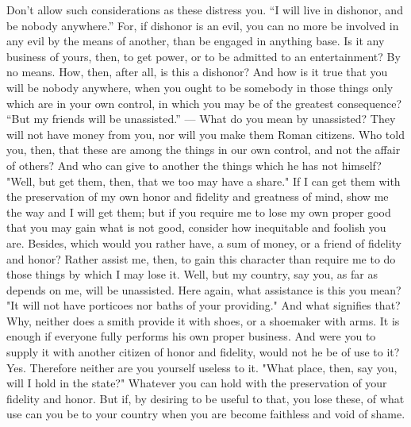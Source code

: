 Don't allow such considerations as these distress you. ``I will
live in dishonor, and be nobody anywhere.'' For, if dishonor is an
evil, you can no more be involved in any evil by the means of another,
than be engaged in anything base. Is it any business of yours, then,
to get power, or to be admitted to an entertainment? By no means.
How, then, after all, is this a dishonor? And how is it true that
you will be nobody anywhere, when you ought to be somebody in those
things only which are in your own control, in which you may be of
the greatest consequence? ``But my friends will be unassisted.'' ---
What do you mean by unassisted? They will not have money from you,
nor will you make them Roman citizens. Who told you, then, that these
are among the things in our own control, and not the affair of others?
And who can give to another the things which he has not himself? "Well,
but get them, then, that we too may have a share." If I can get them
with the preservation of my own honor and fidelity and greatness of
mind, show me the way and I will get them; but if you require me to
lose my own proper good that you may gain what is not good, consider
how inequitable and foolish you are. Besides, which would you rather
have, a sum of money, or a friend of fidelity and honor? Rather assist
me, then, to gain this character than require me to do those things
by which I may lose it. Well, but my country, say you, as far as depends
on me, will be unassisted. Here again, what assistance is this you
mean? "It will not have porticoes nor baths of your providing." And
what signifies that? Why, neither does a smith provide it with shoes,
or a shoemaker with arms. It is enough if everyone fully performs
his own proper business. And were you to supply it with another citizen
of honor and fidelity, would not he be of use to it? Yes. Therefore
neither are you yourself useless to it. "What place, then, say you,
will I hold in the state?" Whatever you can hold with the preservation
of your fidelity and honor. But if, by desiring to be useful to that,
you lose these, of what use can you be to your country when you are
become faithless and void of shame. 
